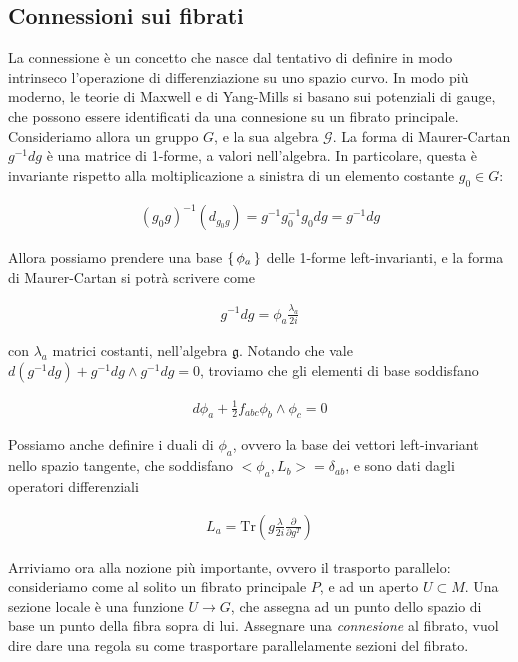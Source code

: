 \documentclass{report}
\begin{document}
\subsection{Connessioni sui fibrati}


La connessione è un concetto che nasce dal tentativo di definire in modo intrinseco l'operazione di differenziazione su uno spazio curvo. In modo più moderno, le teorie di Maxwell e di Yang-Mills si basano sui potenziali di gauge, che possono essere identificati da una connesione su un fibrato principale. \\

Consideriamo allora un gruppo \(G\), e la sua algebra \(\mathcal{G}\). La forma di Maurer-Cartan \(g^{-1}dg\) è una matrice di 1-forme, a valori nell'algebra. In particolare, questa è invariante rispetto alla moltiplicazione a sinistra di un elemento costante \(g_0 \in G\): 

\begin{align}
    (g_0g)^{-1}(d_{g_0g}) = g^{-1}g_0^{-1}g_0 dg = g^{-1}dg
\end{align}

Allora possiamo prendere una base \(\set{\phi_a}\) delle 1-forme left-invarianti, e la forma di Maurer-Cartan si potrà scrivere come 

\begin{align}
    g^{-1}dg = \phi_a \frac{\lambda_a}{2i}
\end{align}

con \(\lambda_a\) matrici costanti, nell'algebra \(\mathfrak{g}\). Notando che vale \(d(g^{-1}dg) + g^{-1}dg \wedge g^{-1}dg = 0\), troviamo che gli elementi di base soddisfano 

\begin{align}
    d\phi_a + \frac{1}{2}f_{abc} \phi_b \wedge \phi_c = 0 
\end{align}

Possiamo anche definire i duali di \(\phi_a\), ovvero la base dei vettori left-invariant nello spazio tangente, che soddisfano \(<\phi_a, L_b> = \delta_{ab}\), e sono dati dagli operatori differenziali 

\begin{align}
    L_a = \text{Tr}\left(g\frac{\lambda}{2i}\frac{\partial}{\partial g^T} \right)
\end{align}

Arriviamo ora alla nozione più importante, ovvero il trasporto parallelo: consideriamo come al solito un fibrato principale \(P\), e ad un aperto \(U \subset M\). Una sezione locale è una funzione \(U \rightarrow G\), che assegna ad un punto dello spazio di base un punto della fibra sopra di lui. Assegnare una \emph{connesione} al fibrato, vuol dire dare una regola su come trasportare parallelamente sezioni del fibrato. \\
\end{document}
